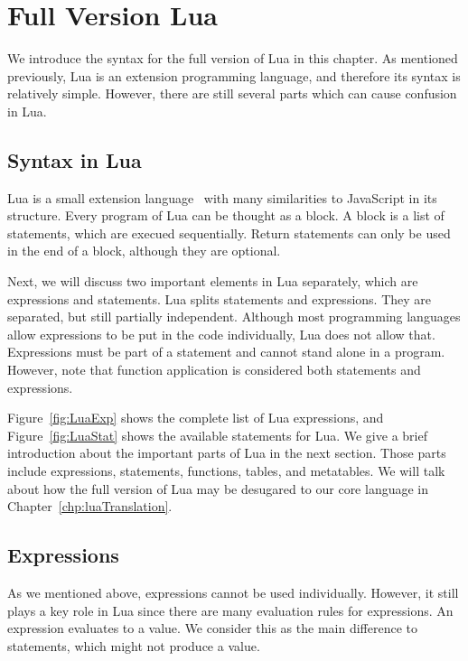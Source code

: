 \newcommand{\syntax}[2]{{\tt #1}{\tt ~::=}{\tt ~~#2}\\}
\newcommand{\syntaxcase}[1]{{\tt \quad\quad\quad\quad\quad\quad~}{\tt ~~#1}\\}
\newcommand{\mydefhead}[2]{\multicolumn{2}{l}{{#1}}&\mbox{\emph{#2}}\\}
\newcommand{\mydefcase}[2]{\qquad\qquad& #1 &\mbox{#2}\\}
\newcommand{\functiondef}[2]{\mbox{\tt function}~(\overline{#1_i})~#2~ {\tt end}}


\chapter{Full Version Lua}
We introduce the syntax for the full version of Lua in this chapter. As mentioned previously, Lua is an extension programming language, and therefore its syntax is relatively simple. However, there are still several parts which can cause confusion in Lua.

\section{Syntax in Lua}
Lua is a small extension language~\cite{PIL} with many similarities to JavaScript in its structure. Every program of Lua can be thought as a block. A block is a list of statements, which are execued sequentially. Return statements can only be used in the end of a block, although they are optional.

Next, we will discuss two important elements in Lua separately, which are expressions and statements.
Lua splits statements and expressions.
They are separated, but still partially independent. Although most programming languages allow expressions to be put in the code individually, Lua does not allow that. Expressions must be part of a statement and cannot stand alone in a program. However, note that function application is considered both statements and expressions.

Figure~\ref{fig:LuaExp} shows the complete list of Lua expressions, and Figure~\ref{fig:LuaStat} shows the available statements for Lua. We give a brief introduction about the important parts of Lua in the next section. Those parts include expressions, statements, functions, tables, and metatables. We will talk about how the full version of Lua may be desugared to our core language in Chapter~\ref{chp:luaTranslation}.

\section{Expressions}
As we mentioned above, expressions cannot be used individually. However, it still plays a key role in Lua since there are many evaluation rules for expressions. An expression evaluates to a value. We consider this as the main difference to statements,
which might not produce a value.

